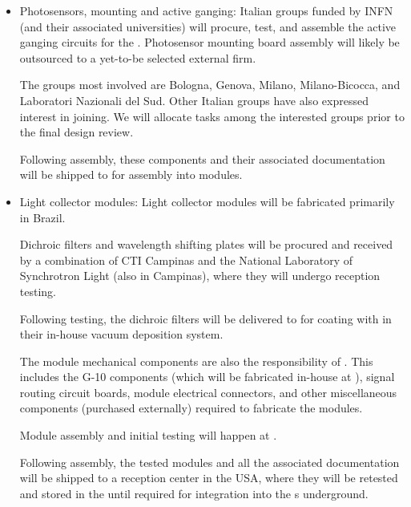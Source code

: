 \begin{itemize}

\item Photosensors, mounting and active ganging:  %
Italian groups funded by INFN (and their associated universities) will procure, test, and assemble the active ganging circuits for the . Photosensor mounting board assembly will likely be outsourced to a yet-to-be selected external firm. %

The groups most involved %
are Bologna, Genova, Milano, Milano-Bicocca, and Laboratori Nazionali del Sud.  Other Italian groups have also expressed interest in joining.  We will allocate tasks among the interested groups prior to the final design review.

Following assembly, these components and their associated  documentation will be shipped to  for assembly into  modules.

\item Light collector modules:  Light collector modules will be fabricated primarily in Brazil.  

Dichroic filters and wavelength shifting plates will be procured and received by a combination of CTI Campinas and the National Laboratory of Synchrotron Light (also in Campinas), where they will undergo reception  testing.

Following testing, the dichroic filters will be delivered to  for coating with  in their in-house vacuum deposition system.

The module mechanical components are also the responsibility of .  This includes the \frfour G-10 components (which will be fabricated in-house at ), signal routing circuit boards, module electrical connectors, and other miscellaneous components (purchased externally) required to fabricate the modules.

Module assembly and initial  testing will happen at .

Following assembly, the tested modules and all the associated  documentation will be shipped to a reception center in the USA, where they will be retested and stored in the  until required for integration into the s underground.



\end{itemize}

